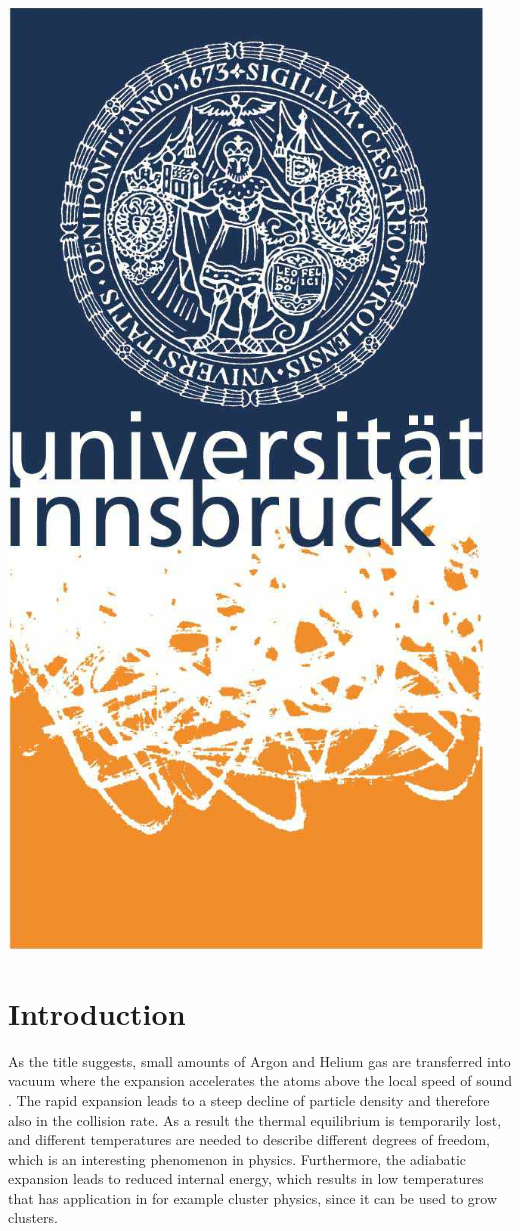 \documentclass[a4paper,10pt]{article}
\begin{document}
\begin{titlepage}
	\begin{center}
	\includegraphics[scale=0.567]{img/uibk}
	\end{center}

\end{titlepage}

\section{Introduction}
As the title suggests, small amounts of Argon and Helium gas are transferred into vacuum where the expansion accelerates the atoms above the local speed of sound \cite{illinois}. The rapid expansion leads to a steep decline of particle density and therefore also in the collision rate. As a result the thermal equilibrium is temporarily lost, and different temperatures are needed to describe different degrees of freedom, which is an interesting phenomenon in physics. Furthermore, the adiabatic expansion leads to reduced internal energy, which results in low temperatures that has application in for example cluster physics, since it can be used to grow clusters.
\end{document}
